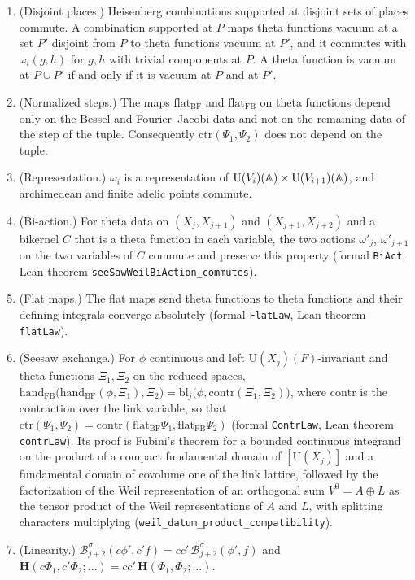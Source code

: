 \begin{hypothesis}\label{w3s:hyp:gen}
\begin{enumerate}[label=(W\arabic*),leftmargin=*]
\item\label{w3s:W1} (Disjoint places.) Heisenberg combinations supported at disjoint sets of places commute. A combination supported at $P$ maps theta functions vacuum at a set $P'$ disjoint from $P$ to theta functions vacuum at $P'$, and it commutes with $\omega_i(g,h)$ for $g,h$ with trivial components at $P$. A theta function is vacuum at $P\cup P'$ if and only if it is vacuum at $P$ and at $P'$.
\item\label{w3s:W2} (Normalized steps.) The maps $\mathrm{flat}_{\mathrm{BF}}$ and $\mathrm{flat}_{\mathrm{FB}}$ on theta functions depend only on the Bessel and Fourier--Jacobi data and not on the remaining data of the step of the tuple. Consequently $\mathrm{ctr}(\Psi_1,\Psi_2)$ does not depend on the tuple.
\item\label{w3s:W3} (Representation.) $\omega_i$ is a representation of $\mathrm U(V_i)(\mathbb A)\times\mathrm U(V_{i+1})(\mathbb A)$, and archimedean and finite adelic points commute.
\item\label{w3s:W4} (Bi-action.) For theta data on $(X_j,X_{j+1})$ and $(X_{j+1},X_{j+2})$ and a bikernel $C$ that is a theta function in each variable, the two actions $\omega'_j$, $\omega'_{j+1}$ on the two variables of $C$ commute and preserve this property (formal \texttt{BiAct}, Lean theorem \texttt{seeSawWeilBiAction\_commutes}).
\item\label{w3s:W5} (Flat maps.) The flat maps send theta functions to theta functions and their defining integrals converge absolutely (formal \texttt{FlatLaw}, Lean theorem \texttt{flatLaw}).
\item\label{w3s:W6} (Seesaw exchange.) For $\phi$ continuous and left $\mathrm U(X_j)(F)$-invariant and theta functions $\Xi_1,\Xi_2$ on the reduced spaces, $\mathrm{hand}_{\mathrm{FB}}\bigl(\mathrm{hand}_{\mathrm{BF}}(\phi,\Xi_1),\Xi_2\bigr)=\mathrm{bl}_j\bigl(\phi,\mathrm{contr}(\Xi_1,\Xi_2)\bigr)$, where $\mathrm{contr}$ is the contraction over the link variable, so that $\mathrm{ctr}(\Psi_1,\Psi_2)=\mathrm{contr}(\mathrm{flat}_{\mathrm{BF}}\Psi_1,\mathrm{flat}_{\mathrm{FB}}\Psi_2)$
(formal \texttt{ContrLaw}, Lean theorem \texttt{contrLaw}). Its proof is Fubini's theorem for a bounded continuous integrand on the product of a compact fundamental domain of $[\mathrm U(X_j)]$ and a fundamental domain of covolume one of the link lattice, followed by the factorization of the Weil representation of an orthogonal sum $V^0=A\oplus L$ as the tensor product of the Weil representations of $A$ and $L$, with splitting characters multiplying (\texttt{weil\_datum\_product\_compatibility}).
\item\label{w3s:W7} (Linearity.) $\mathcal B^\sigma_{j+2}(c\phi',c'f)=cc'\,\mathcal B^\sigma_{j+2}(\phi',f)$ and $\mathbf H(c\Phi_1,c'\Phi_2;\dots)=cc'\,\mathbf H(\Phi_1,\Phi_2;\dots)$.
\end{enumerate}
\end{hypothesis}

